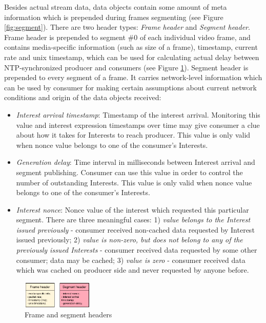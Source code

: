 \documentclass{icn/sig-alternate-2012} %
\begin{document}
Besides actual stream data, data objects contain some amount of meta information which is prepended during frames segmenting (see Figure \ref{fig:segment}). There are two header types: \textit{Frame header} and \textit{Segment header}. Frame header is prepended to segment \#0 of each individual video frame, and contains media-specific information (such as size of a frame), timestamp, current rate and unix timestamp, which can be used for calculating actual delay between NTP-synchronized producer and consumers (see Figure \ref{fig:data-struct}). Segment header is prepended to every segment of a frame. It carries network-level information which can be used by consumer for making certain assumptions about current network conditions and origin of the data objects received:
\begin{itemize} [label={}]

\item \textit{Interest arrival timestamp}: Timestamp of the interest arrival. Monitoring this value and interest expression timestamps over time may give consumer a clue about how it takes for Interests to reach producer. This value is only valid when nonce value belongs to one of the consumer's Interests.

\item \textit{Generation delay}: Time interval in milliseconds between Interest arrival and segment publishing. Consumer can use this value in order to control the number of outstanding Interests. This value is only valid when nonce value belongs to one of the consumer's Interests.

\item \textit{Interest nonce}: Nonce value of the interest which requested this particular segment. There are three meaningful cases:  1) \textit{value belongs to the Interest issued previously} - consumer received non-cached data requested by Interest issued previously; 2) \textit{value is non-zero, but does not belong to any of the previously issued Interests} - consumer received data requested by some other consumer; data may be cached; 3) \textit{value is zero} - consumer received data which was cached on producer side and never requested by anyone before.

\end{itemize}

\begin{figure}[t!]
\centering
\includegraphics[width=0.3\textwidth]{data-struct}
\vspace{-4pt}
\caption{Frame and segment headers}
\label{fig:data-struct}
\end{figure}
\end{document}
